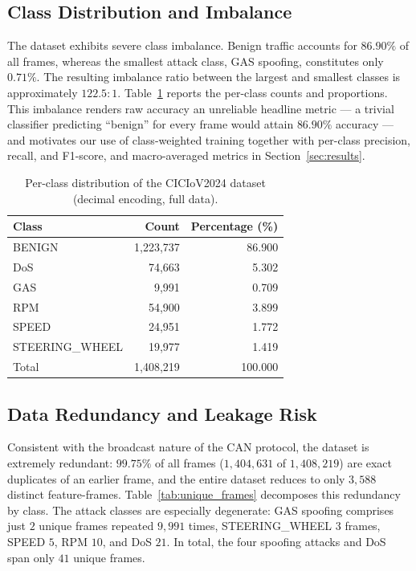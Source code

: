 \documentclass[conference]{IEEEtran}
\begin{document}
\subsection{Class Distribution and Imbalance}

The dataset exhibits severe class imbalance. Benign traffic accounts for
$86.90\%$ of all frames, whereas the smallest attack class, GAS spoofing,
constitutes only $0.71\%$. The resulting imbalance ratio between the largest and
smallest classes is approximately $122.5{:}1$. Table~\ref{tab:class_distribution}
reports the per-class counts and proportions. This imbalance renders raw
accuracy an unreliable headline metric --- a trivial classifier predicting
``benign'' for every frame would attain $86.90\%$ accuracy --- and motivates our
use of class-weighted training together with per-class precision, recall, and
F1-score, and macro-averaged metrics in Section~\ref{sec:results}.

\begin{table}[htbp]
\centering
\caption{Per-class distribution of the CICIoV2024 dataset (decimal encoding, full data).}
\label{tab:class_distribution}
\begin{tabular}{lrr}
\hline
Class & Count & Percentage (\%) \\
\hline
BENIGN          & 1{,}223{,}737 & 86.900 \\
DoS             & 74{,}663      & 5.302 \\
GAS             & 9{,}991       & 0.709 \\
RPM             & 54{,}900      & 3.899 \\
SPEED           & 24{,}951      & 1.772 \\
STEERING\_WHEEL & 19{,}977      & 1.419 \\
\hline
Total           & 1{,}408{,}219 & 100.000 \\
\hline
\end{tabular}
\end{table}

\subsection{Data Redundancy and Leakage Risk}

Consistent with the broadcast nature of the CAN protocol, the dataset is
extremely redundant: $99.75\%$ of all frames ($1{,}404{,}631$ of $1{,}408{,}219$)
are exact duplicates of an earlier frame, and the entire dataset reduces to only
$3{,}588$ distinct feature-frames. Table~\ref{tab:unique_frames} decomposes this
redundancy by class. The attack classes are especially degenerate: GAS spoofing
comprises just $2$ unique frames repeated $9{,}991$ times, STEERING\_WHEEL $3$
frames, SPEED $5$, RPM $10$, and DoS $21$. In total, the four spoofing attacks
and DoS span only $41$ unique frames.
\end{document}
